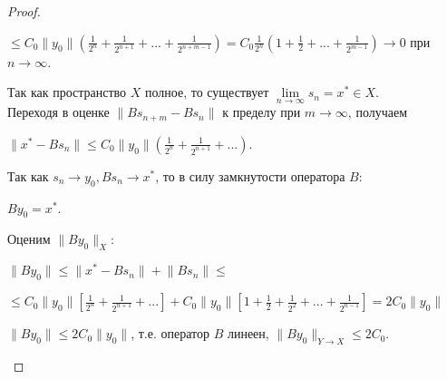 \documentclass[12pt,a4paper,titlepage, oneside]{book}
\theoremstyle{definition}
\theoremstyle{plain}
\theoremstyle{remark}
\theoremstyle{remark}
\theoremstyle{remark}
\theoremstyle{plain}
\theoremstyle{plain}
\begin{document}
\begin{proof}
\begin{enumerate}
\begin{center}
$\leq C_0 \lVert y_0 \rVert (\frac{1}{2^n} + \frac{1}{2^{n+1}}+...+\frac{1}{2^{n+m-1}})=C_0 \frac{1}{2^n} (1 + \frac{1}{2}+...+\frac{1}{2^{m-1}}) \to 0$ при $n \to \infty$.
\end{center}

Так как пространство $X$ полное, то существует $\lim \limits_{n \to \infty} s_n=x^* \in X$. \\
Переходя в оценке $ \lVert B s_{n+m}-B s_n \rVert$ к пределу при $m \to \infty$, получаем

\begin{center}
$ \lVert x^*-B s_n \rVert \leq C_0 \lVert y_0\rVert (\frac{1}{2^n} + \frac{1}{2^{n+1}}+...)$.
\end{center}

Так как $s_n \to y_0, B s_n \to x^*$, то в силу замкнутости оператора $B$: 

\begin{center}
$B y_0=x^* $.
\end{center}

Оценим $\lVert B y_0 \rVert _X$:

\begin{center}
$\lVert B y_0 \rVert \leq \lVert x^* - B s_n \rVert + \lVert B s_n \rVert \leq$ 
\end{center}

\begin{center}
$\leq C_0 \lVert y_0\rVert [\frac{1}{2^n} + \frac{1}{2^{n+1}}+...] + C_0 \lVert y_0\rVert [1+\frac{1}{2} +\frac{1}{2^2}+ ...+\frac{1}{2^{n-1}}]= 2 C_0 \lVert y_0\rVert$
\end{center}

$\lVert B y_0 \rVert \leq 2 C_0 \lVert y_0\rVert$, т.е. оператор $B$ линеен, $ \lVert B y_0 \rVert _{Y \to X} \leq 2 C_0$.

\end{enumerate}

\end{proof}
\end{document}
